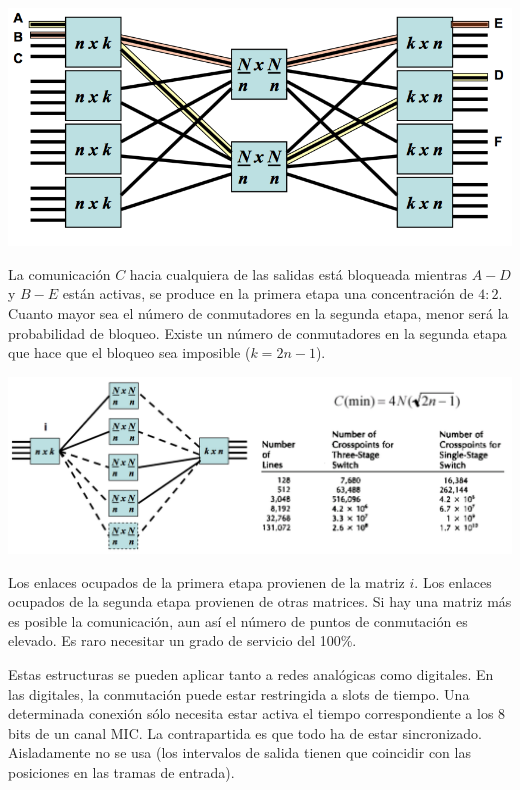 \documentclass[10pt,portrait, twocolumn]{article}
\begin{document}
	\begin{center}
		\includegraphics[scale = 0.3]{concentracion}
	\end{center}
	
La comunicación $C$ hacia cualquiera de las salidas está bloqueada mientras $A-D$ y $B-E$ están activas, se produce en la primera etapa una concentración de $4:2$. Cuanto mayor sea el número de conmutadores en la segunda etapa, menor será la probabilidad de bloqueo. Existe un número de conmutadores en la segunda etapa que hace que el bloqueo sea imposible ($k = 2n - 1$).
	
	\begin{center}
		\includegraphics[scale = 0.3]{espacial}
	\end{center}
	
Los enlaces ocupados de la primera etapa provienen de la matriz $i$. Los enlaces ocupados de la segunda etapa provienen de otras matrices. Si hay una matriz más es posible la comunicación, aun así el número de puntos de conmutación es elevado. Es raro necesitar un grado de servicio del 100\%. 

Estas estructuras se pueden aplicar tanto a redes analógicas como digitales. En las digitales, la conmutación puede estar restringida a slots de tiempo. Una determinada conexión sólo necesita estar activa el tiempo correspondiente a los 8 bits de un canal MIC. La contrapartida es que todo ha de estar sincronizado. Aisladamente no se usa (los intervalos de salida tienen que coincidir con las posiciones en las tramas de entrada).
\end{document}
